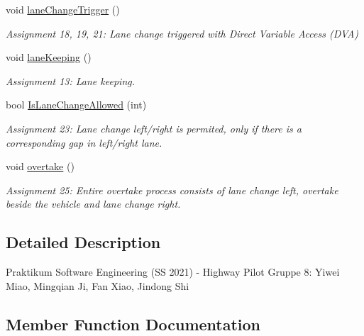 \begin{DoxyCompactItemize}
void \mbox{\hyperlink{class_highway_pilot_system_a3f08e40f0aaafa6fb0e23f27d5d27d4b}{lane\+Change\+Trigger}} ()
\begin{DoxyCompactList}\small\item\em Assignment 18, 19, 21\+: Lane change triggered with Direct Variable Access (D\+VA) \end{DoxyCompactList}\item 
\mbox{\label{class_highway_pilot_system_a579f4175760668121b7fdd57b3804900}} 
void \mbox{\hyperlink{class_highway_pilot_system_a579f4175760668121b7fdd57b3804900}{lane\+Keeping}} ()
\begin{DoxyCompactList}\small\item\em Assignment 13\+: Lane keeping. \end{DoxyCompactList}\item 
bool \mbox{\hyperlink{class_highway_pilot_system_a88bbdd6617343c2e29a2ca94c5c96e6a}{Is\+Lane\+Change\+Allowed}} (int)
\begin{DoxyCompactList}\small\item\em Assignment 23\+: Lane change left/right is permited, only if there is a corresponding gap in left/right lane. \end{DoxyCompactList}\item 
void \mbox{\hyperlink{class_highway_pilot_system_a0b311d6e8831aa28175f36b84e3bd8f2}{overtake}} ()
\begin{DoxyCompactList}\small\item\em Assignment 25\+: Entire overtake process consists of lane change left, overtake beside the vehicle and lane change right. \end{DoxyCompactList}\end{DoxyCompactItemize}


\subsection{Detailed Description}
Praktikum Software Engineering (SS 2021) -\/ Highway Pilot Gruppe 8\+: Yiwei Miao, Mingqian Ji, Fan Xiao, Jindong Shi 

\subsection{Member Function Documentation}
\mbox{\label{class_highway_pilot_system_a8a0b3e790d26f76eeb74586f3d6aeeac}} 
